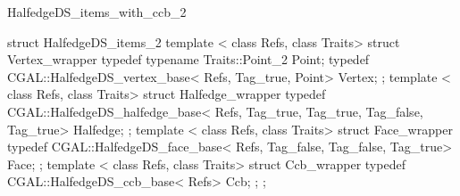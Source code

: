 \begin{ccRefClass}{HalfedgeDS_items_with_ccb_2}
\begin{ccExampleCode}
struct HalfedgeDS_items_2 {
    template < class Refs, class Traits>
    struct Vertex_wrapper {
        typedef typename Traits::Point_2 Point;
        typedef CGAL::HalfedgeDS_vertex_base< Refs, Tag_true, Point> Vertex;
    };
    template < class Refs, class Traits>
    struct Halfedge_wrapper {
        typedef CGAL::HalfedgeDS_halfedge_base< Refs, Tag_true, Tag_true, Tag_false, Tag_true> Halfedge;
    };
    template < class Refs, class Traits>
    struct Face_wrapper {
        typedef CGAL::HalfedgeDS_face_base< Refs, Tag_false, Tag_false, Tag_true> Face;
    };
    template < class Refs, class Traits>
    struct Ccb_wrapper {
        typedef CGAL::HalfedgeDS_ccb_base< Refs> Ccb;
    };
};
\end{ccExampleCode}


\end{ccRefClass}

\ccRefPageEnd

